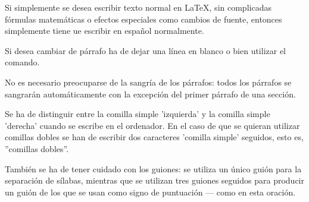 \documentclass[a4paper,10pt]{letter}
\begin{document}
Si simplemente se desea escribir texto normal en LaTeX, 
sin complicadas f\'ormulas matem\'aticas o efectos especiales
como cambios de fuente, entonces simplemente tiene ue escribir
en espa\~nol normalmente.\par
Si desea cambiar de párrafo ha de dejar una línea en blanco o bien
utilizar el comando. \par
No es necesario preocuparse de la sangría de los párrafos:
todos los párrafos se sangrarán automáticamente con la excepción
del primer párrafo de una sección.


Se ha de distinguir entre la comilla simple 'izquierda'
y la comilla simple 'derecha' cuando se escribe en el ordenador.
En el caso de que se quieran utilizar co\-mi\-llas dobles se han de
escribir dos caracteres 'comilla simple' seguidos, esto es,
''comillas dobles''.


También se ha de tener cuidado con los guiones: se utiliza un único
guión para la separación de sílabas, mientras que se utilizan
tres guiones seguidos para producir un guión de los que se usan
como signo de puntuación --- como en esta oración.
\end{document}
